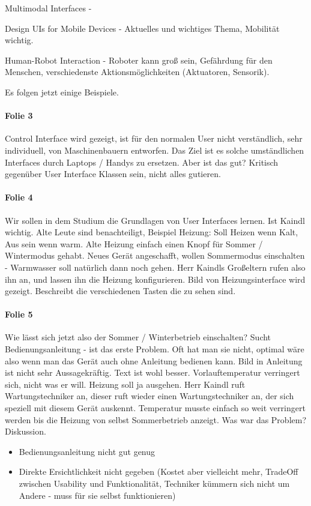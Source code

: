 Multimodal Interfaces - 

Design UIs for Mobile Devices - Aktuelles und wichtiges Thema, Mobilität wichtig.

Human-Robot Interaction - Roboter kann groß sein, Gefährdung für den Menschen,
verschiedenste Aktionsmöglichkeiten (Aktuatoren, Sensorik).

Es folgen jetzt einige Beispiele.

\paragraph{Folie 3}
Control Interface wird gezeigt, ist für den normalen User nicht verständlich,
sehr individuell, von Maschinenbauern entworfen. Das Ziel ist es solche umständlichen
Interfaces durch Laptops / Handys zu ersetzen. Aber ist das gut? Kritisch gegenüber 
User Interface Klassen sein, nicht alles gutieren.

\paragraph{Folie 4}
Wir sollen in dem Studium die Grundlagen von User Interfaces lernen. Ist Kaindl wichtig.
Alte Leute sind benachteiligt, Beispiel Heizung: Soll Heizen wenn Kalt, Aus sein wenn warm.
Alte Heizung einfach einen Knopf für Sommer / Wintermodus gehabt. Neues Gerät angeschafft,
wollen Sommermodus einschalten - Warmwasser soll natürlich dann noch gehen.
Herr Kaindls Großeltern rufen also ihn an, und lassen ihn die Heizung konfigurieren. 
Bild von Heizungsinterface wird gezeigt. Beschreibt die verschiedenen Tasten die zu 
sehen sind. 

\paragraph{Folie 5}
Wie lässt sich jetzt also der Sommer / Winterbetrieb einschalten? Sucht
Bedienungsanleitung - ist das erste Problem. Oft hat man sie nicht, optimal wäre
also wenn man das Gerät auch ohne Anleitung bedienen kann. 
Bild in Anleitung ist nicht sehr Aussagekräftig. Text ist wohl besser. 
Vorlauftemperatur verringert sich, nicht was er will. Heizung soll ja ausgehen.
Herr Kaindl ruft Wartungstechniker an, dieser ruft wieder einen Wartungstechniker an,
der sich speziell mit diesem Gerät auskennt. 
Temperatur musste einfach so weit verringert werden bis die Heizung von selbst
Sommerbetrieb anzeigt. 
Was war das Problem? Diskussion.
\begin{itemize}
\item Bedienungsanleitung nicht gut genug
\item Direkte Ersichtlichkeit nicht gegeben (Kostet aber vielleicht mehr, TradeOff
zwischen Usability und Funktionalität, Techniker kümmern sich nicht um Andere - 
muss für sie selbst funktionieren)
\end{itemize}

